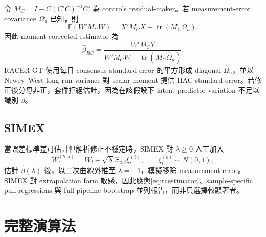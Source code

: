 \documentclass[12pt,a4paper,oneside]{article}
\newcommand{\E}{\mathbb{E}}
\newcommand{\tr}{\operatorname{tr}}
\begin{document}
令 $M_C=I-C(C'C)^{-1}C'$ 為 controls residual-maker。若 measurement-error covariance $\Omega_u$ 已知，則
\begin{equation}
\E(W'M_CW)=X'M_CX+\tr(M_C\Omega_u).
\end{equation}
因此 moment-corrected estimator 為
\begin{equation}
\widehat\beta_{RC}
=\frac{W'M_CY}
{W'M_CW-\tr(M_C\widehat\Omega_u)}.
\label{eq:rcestimator}
\end{equation}
RACER-GT 使用每日 consensus standard error 的平方形成 diagonal $\widehat\Omega_u$，並以 Newey--West long-run variance 對 scalar moment 提供 HAC standard error。若修正後分母非正，套件拒絕估計，因為在該假設下 latent predictor variation 不足以識別 $\beta$。

\subsection{SIMEX}

當誤差標準差可估計但解析修正不穩定時，SIMEX \cite{cookstefanski1994} 對 $\lambda\ge0$ 人工加入
\begin{equation}
W_t^{(b,\lambda)}=W_t+\sqrt{\lambda}\,\widehat\sigma_{u,t}\xi_t^{(b)},
\qquad \xi_t^{(b)}\sim N(0,1),
\end{equation}
估計 $\widehat\beta(\lambda)$ 後，以二次曲線外推至 $\lambda=-1$，模擬移除 measurement error。SIMEX 對 extrapolation form 敏感，因此應與\cref{eq:rcestimator}、sample-specific pull regressions 與 full-pipeline bootstrap 並列報告，而非只選擇較顯著者。

\section{完整演算法}
\end{document}
